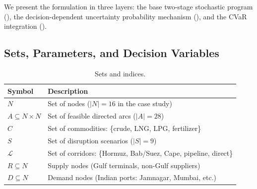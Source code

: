 \documentclass[final,3p,authoryear]{elsarticle}
\theoremstyle{definition}
\begin{document}
We present the formulation in three layers: the base two-stage stochastic
program (), the decision-dependent uncertainty probability mechanism
(), and the CVaR integration ().

\subsection{Sets, Parameters, and Decision Variables}
\label{sec:notation}

\begin{table}[H]
\centering
\caption{Sets and indices.}
\label{tab:sets}
\begin{tabular}{@{}ll@{}}
\toprule
Symbol & Description \\
\midrule
$N$ & Set of nodes ($|N|=16$ in the case study) \\
$A \subseteq N \times N$ & Set of feasible directed arcs ($|A|=28$) \\
$C$ & Set of commodities: \{crude, LNG, LPG, fertilizer\} \\
$S$ & Set of disruption scenarios ($|S|=9$) \\
$\mathcal{L}$ & Set of corridors: \{Hormuz, Bab/Suez, Cape, pipeline, direct\} \\
$R \subseteq N$ & Supply nodes (Gulf terminals, non-Gulf suppliers) \\
$D \subseteq N$ & Demand nodes (Indian ports: Jamnagar, Mumbai, etc.) \\
\bottomrule
\end{tabular}
\end{table}
\end{document}

